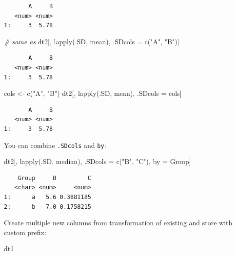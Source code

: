 \documentclass[
]{book}
\newenvironment{Shaded}{\begin{snugshade}}{\end{snugshade}}
\newcommand{\CommentTok}[1]{\textcolor[rgb]{0.56,0.35,0.01}{\textit{#1}}}
\newcommand{\FunctionTok}[1]{\textcolor[rgb]{0.00,0.00,0.00}{#1}}
\newcommand{\NormalTok}[1]{#1}
\newcommand{\OtherTok}[1]{\textcolor[rgb]{0.56,0.35,0.01}{#1}}
\newcommand{\StringTok}[1]{\textcolor[rgb]{0.31,0.60,0.02}{#1}}
\begin{document}
\begin{verbatim}
       A     B
   <num> <num>
1:     3  5.78
\end{verbatim}

\begin{Shaded}
\begin{Highlighting}[]
\CommentTok{\# same as}
\NormalTok{dt2[, }\FunctionTok{lapply}\NormalTok{(.SD, mean), .SDcols }\OtherTok{=} \FunctionTok{c}\NormalTok{(}\StringTok{"A"}\NormalTok{, }\StringTok{"B"}\NormalTok{)]}
\end{Highlighting}
\end{Shaded}

\begin{verbatim}
       A     B
   <num> <num>
1:     3  5.78
\end{verbatim}

\begin{Shaded}
\begin{Highlighting}[]
\NormalTok{cols }\OtherTok{\textless{}{-}} \FunctionTok{c}\NormalTok{(}\StringTok{"A"}\NormalTok{, }\StringTok{"B"}\NormalTok{)}
\NormalTok{dt2[, }\FunctionTok{lapply}\NormalTok{(.SD, mean), .SDcols }\OtherTok{=}\NormalTok{ cols]}
\end{Highlighting}
\end{Shaded}

\begin{verbatim}
       A     B
   <num> <num>
1:     3  5.78
\end{verbatim}

You can combine \texttt{.SDcols} and \texttt{by}:

\begin{Shaded}
\begin{Highlighting}[]
\NormalTok{dt2[, }\FunctionTok{lapply}\NormalTok{(.SD, median), .SDcols }\OtherTok{=} \FunctionTok{c}\NormalTok{(}\StringTok{"B"}\NormalTok{, }\StringTok{"C"}\NormalTok{), by }\OtherTok{=}\NormalTok{ Group]}
\end{Highlighting}
\end{Shaded}

\begin{verbatim}
    Group     B         C
   <char> <num>     <num>
1:      a   5.6 0.3881185
2:      b   7.0 0.1758215
\end{verbatim}

Create multiple new columns from transformation of existing and store with custom prefix:

\begin{Shaded}
\begin{Highlighting}[]
\NormalTok{dt1}
\end{Highlighting}
\end{Shaded}
\end{document}
